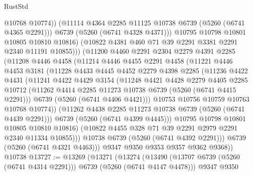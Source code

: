 \begin{lexlean}{RustStd}
\begin{coremodule}
                      @10768
                      @10774))
                  (@11114 @4364 @2285 @11125 @10738 @6739 (@5260 (@6741 @4365 @2291)))
                  @6739
                  (@5260 (@6741 @4328 @4371)))
                @10795
                @10798
                @10801
                @10805
                @10810
                @10816)
              (@10822 @4381 @460 @71 @39 @2291 @3381 @2291 @2340 @11191 @10855)))
          (@11200
            @4460
            @2291
            @2304
            @2279
            @4391
            @2285
            (@11208
              @4446
              @4458
              (@11214
                @4446
                @4455
                @2291
                @4458
                (@11221
                  @4446
                  @4453
                  @3181
                  (@11228
                    @4433
                    @4445
                    @4452
                    @2279
                    @4398
                    @2285
                    (@11236
                      @4422
                      @4431
                      (@11241
                        @4422
                        @4429
                        @3154
                        (@11248
                          @4421
                          @4428
                          @2279
                          @4405
                          @2285
                          @10712
                          (@11262 @4414 @2285 @11273 @10738 @6739 (@5260 (@6741 @4415 @2291)))
                          @6739
                          (@5260 (@6741 @4406 @4421)))
                        @10753
                        @10756
                        @10759
                        @10763
                        @10768
                        @10774))
                    (@11262 @4438 @2285 @11273 @10738 @6739 (@5260 (@6741 @4439 @2291)))
                    @6739
                    (@5260 (@6741 @4399 @4445)))
                  @10795
                  @10798
                  @10801
                  @10805
                  @10810
                  @10816)
                (@10822 @4455 @328 @71 @39 @2291 @2979 @2291 @2340 @11334 @10855)))
            @10738
            @6739
            (@5260 (@6741 @4392 @2291)))
          @6739
          (@5260 (@6741 @4321 @4463)))
        @9347
        @9350
        @9353
        @9357
        @9362
        @9368))
    @10738
@13727 := @13269
    (@13271
      (@13274
        (@13490 (@13707 @6739 (@5260 (@6741 @4314 @2291))) @6739 (@5260 (@6741 @4147 @4478)))
        @9347
        @9350

\end{coremodule}
\end{lexlean}
